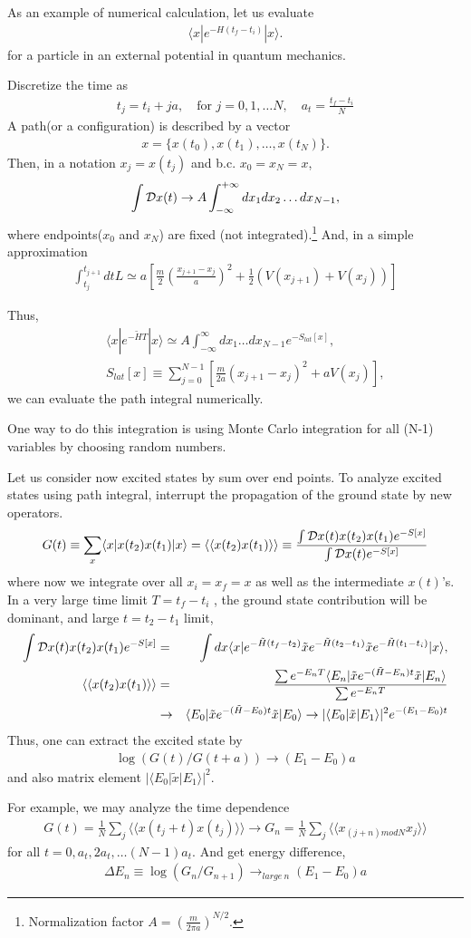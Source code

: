 \documentclass[10pt]{book}
\newcommand{\bea}{\begin{eqnarray}}
\newcommand{\eea}{\end{eqnarray}}
\newcommand{\no}{\nonumber \\}
\def\la{\langle}
\def\ra{\rangle}
\begin{document}
As an example of numerical calculation, let us evaluate 
\bea 
\la x| e^{-H(t_f-t_i)}|x\ra. 
\eea 
for a particle in an external potential in quantum mechanics.

Discretize the time as 
\bea 
t_j=t_i+j a,\quad \mbox{for }j=0,1,\dots N,\quad a_t=\frac{t_f-t_i}{N}
\eea 
A path(or a configuration) is described by a vector
\bea 
x=\{ x(t_0),x(t_1),\dots, x(t_N)\}.
\eea 
Then, in a notation $x_j=x(t_j)$ and b.c. $x_0=x_N=x$,
\bea 
\int {\cal D}x(t)\to A\int_{-\infty}^{+\infty} dx_1 dx_2\dots dx_{N-1},
\eea 
where endpoints($x_0$ and $x_N$) are fixed (not integrated).\footnote{
Normalization factor $A=(\frac{m}{2\pi a})^{N/2}$.} 
And, in a simple approximation
\bea 
\int_{t_j}^{t_{j+1}} dt L\simeq a\left[\frac{m}{2}\left(\frac{x_{j+1}-x_j}{a}\right)^2+\frac{1}{2}(V(x_{j+1})+V(x_j))\right]  
\eea 

Thus, 
\bea 
& &\la x|e^{-\tilde{H} T}|x\ra \simeq A\int_{-\infty}^\infty dx_1\dots d x_{N-1} e^{-S_{lat}[x]},\no 
& &S_{lat}[x]\equiv \sum_{j=0}^{N-1} \left[\frac{m}{2a}(x_{j+1}-x_j)^2+a V(x_j) \right],
\eea 
we can evaluate the path integral numerically. 

One way to do this integration is using Monte Carlo integration for all (N-1) variables by choosing 
random numbers. 

Let us consider now excited states by sum over end points. 
To analyze excited states using path integral, 
interrupt the propagation of the ground state by new operators. 
\bea 
G(t)\equiv \sum_{x} \la x|x(t_2)x(t_1)|x\ra =
    \la \la x(t_2)x(t_1)\ra \ra 
    \equiv \frac{\int {\cal D}x(t) x(t_2)x(t_1)e^{-S[x]}}{\int {\cal D}x(t)e^{-S[x]}  }
\eea 
where now we integrate over all $x_i=x_f=x$ as well as the intermediate $x(t)$'s. 
In a very large time limit $T=t_f-t_i$ , the ground state contribution will be dominant,
and large $t=t_2-t_1$ limit,
\bea 
\int {\cal D}x(t) x(t_2)x(t_1)e^{-S[x]}&=&
   \int dx \la x| e^{-\tilde{H}(t_f-t_2)}\tilde{x} e^{-\tilde{H}(t_2-t_1)}\tilde{x} e^{-\tilde{H}(t_1-t_i)}|x\ra 
   ,\no 
\la \la x(t_2)x(t_1)\ra \ra&=&\frac{\sum e^{-E_n T}\la E_n|\tilde{x} e^{-(\tilde{H}-E_n)t}\tilde{x}|E_n\ra}
                         {\sum e^{-E_n T}} \no 
                         &\to& \la E_0| \tilde{x} e^{-(\tilde{H}-E_0)t}\tilde{x}|E_0\ra
                         \to |\la E_0|\tilde{x}|E_1\ra|^2 e^{-(E_1-E_0)t} 
\eea 
Thus, one can extract the excited state by 
\bea 
\log (G(t) /G(t+a))\to (E_1-E_0) a
\eea 
and also matrix element $|\la E_0|\tilde{x}|E_1\ra|^2$. 

For example, we may analyze the time dependence
\bea 
G(t)=\frac{1}{N}\sum_j \la \la x(t_j+t)x(t_j)\ra\ra
\to G_n = \frac{1}{N}\sum_j \la \la x_{(j+n)mod N}  x_j\ra\ra 
\eea 
for all $t=0,a_t,2a_t,\dots (N-1) a_t$. And get energy difference,
\bea 
\Delta E_n\equiv \log(G_n/G_{n+1})\to_{large\ n} (E_1-E_0)a
\eea 
\end{document}
